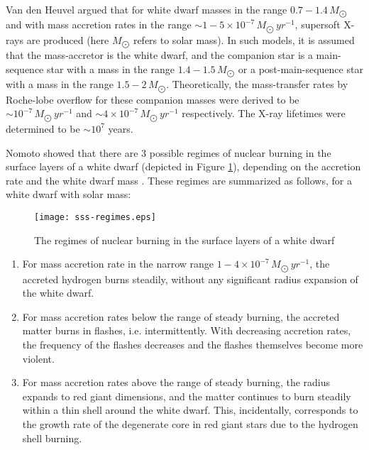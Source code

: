         	Van den Heuvel argued that for white dwarf masses in the range $0.7-1.4\,M_{\bigodot}$ and with mass accretion rates in the range $\sim 1-5\times 10^{-7}\,M_{\bigodot}\,yr^{-1}$, supersoft X-rays are produced \cite{vandenHeuvel92} (here $M_{\bigodot}$ refers to solar mass). In such models, it is assumed that the mass-accretor is the white dwarf, and the companion star is a main-sequence star with a mass in the range $1.4-1.5\,M_{\bigodot}$ or a post-main-sequence star with a mass in the range $1.5-2\,M_{\bigodot}$. Theoretically, the mass-transfer rates by Roche-lobe overflow for these companion masses were derived to be $\sim 10^{-7}\,M_{\bigodot}\,yr^{-1}$ and $\sim 4 \times 10^{-7}\,M_{\bigodot}\,yr^{-1}$ respectively. The X-ray lifetimes were determined to be $\sim 10^{7}$ years.
        	
        	Nomoto showed that there are 3 possible regimes of nuclear burning in the surface layers of a white dwarf (depicted in Figure \ref{fig:regimes-wd}), depending on the accretion rate and the white dwarf mass \cite{nomoto82}. These regimes are summarized as follows, for a white dwarf with solar mass:
        	
        	\begin{figure}[h!]
        		\begin{center}
        			\texttt{[image: sss-regimes.eps]}
        			\caption{The regimes of nuclear burning in the surface layers of a white dwarf \cite{nomoto82}}
        			\label{fig:regimes-wd}
        		\end{center}
        	\end{figure}
        	
        	\begin{enumerate}
				\item For mass accretion rate in the narrow range $1-4\times 10^{-7}\,M_{\bigodot}\,yr^{-1}$, the accreted hydrogen burns steadily, without any significant radius expansion of the white dwarf.
				\item For mass accretion rates below the range of steady burning, the accreted matter burns in flashes, i.e. intermittently. With decreasing accretion rates, the frequency of the flashes decreases and the flashes themselves become more violent.
				\item For mass accretion rates above the range of steady burning, the radius expands to red giant dimensions, and the matter continues to burn steadily within a thin shell around the white dwarf. This, incidentally, corresponds to the growth rate of the degenerate core in red giant stars due to the hydrogen shell burning.
			\end{enumerate}
			
